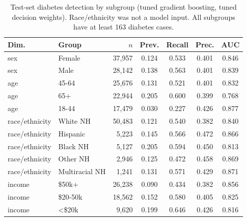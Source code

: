 \begin{table}[t]
\centering\footnotesize
\caption{Test-set diabetes detection by subgroup (tuned gradient boosting, tuned decision weights). Race/ethnicity was not a model input. All subgroups have at least 163 diabetes cases.}
\label{tab:subgroups}
\setlength{\tabcolsep}{3.5pt}
\begin{tabular}{@{}llrcccc@{}}
\toprule
Dim. & Group & $n$ & Prev. & Recall & Prec. & AUC\\
\midrule
sex & Female & 37,957 & 0.124 & 0.533 & 0.401 & 0.846 \\
sex & Male & 28,142 & 0.138 & 0.563 & 0.401 & 0.839 \\
age & 45-64 & 25,676 & 0.131 & 0.521 & 0.401 & 0.832 \\
age & 65+ & 22,944 & 0.205 & 0.600 & 0.399 & 0.768 \\
age & 18-44 & 17,479 & 0.030 & 0.227 & 0.426 & 0.877 \\
race/ethnicity & White NH & 50,483 & 0.121 & 0.540 & 0.382 & 0.840 \\
race/ethnicity & Hispanic & 5,223 & 0.145 & 0.566 & 0.472 & 0.866 \\
race/ethnicity & Black NH & 5,127 & 0.205 & 0.594 & 0.450 & 0.813 \\
race/ethnicity & Other NH & 2,946 & 0.125 & 0.472 & 0.458 & 0.869 \\
race/ethnicity & Multiracial NH & 1,241 & 0.131 & 0.571 & 0.429 & 0.871 \\
income & \$50k+ & 26,238 & 0.090 & 0.434 & 0.382 & 0.856 \\
income & \$20-50k & 18,562 & 0.152 & 0.580 & 0.405 & 0.825 \\
income & <\$20k & 9,620 & 0.199 & 0.646 & 0.426 & 0.816 \\
\bottomrule
\end{tabular}
\end{table}

